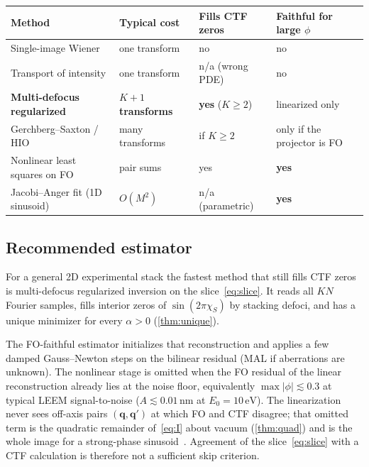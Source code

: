 \documentclass[11pt,a4paper]{article}
\theoremstyle{definition}
\theoremstyle{remark}
\newcommand{\abs}[1]{\lvert#1\rvert}
\begin{document}
\begin{center}
\small
\setlength{\tabcolsep}{4pt}
\begin{tabular}{@{}lp{2.6cm}p{2.6cm}p{2.8cm}@{}}
\toprule
Method & Typical cost & Fills CTF zeros & Faithful for large $\phi$ \\
\midrule
Single-image Wiener & one transform & no & no \\
Transport of intensity & one transform & n/a (wrong PDE) & no \\
\textbf{Multi-defocus regularized} & \textbf{$K{+}1$ transforms} & \textbf{yes} ($K\ge 2$) & linearized only \\
Gerchberg--Saxton / HIO & many transforms & if $K\ge 2$ & only if the projector is FO \\
Nonlinear least squares on FO & pair sums & yes & \textbf{yes} \\
Jacobi--Anger fit (1D sinusoid) & $O(M^2)$ & n/a (parametric) & \textbf{yes} \\
\bottomrule
\end{tabular}
\end{center}

\subsection{Recommended estimator}
\label{sec:verdict}

For a general 2D experimental stack the fastest method that still
fills CTF zeros is multi-defocus regularized inversion on
the slice~\eqref{eq:slice}.
It reads all $KN$ Fourier samples, fills interior zeros of
$\sin(2\pi\chi_S)$ by stacking defoci, and has a unique minimizer for
every $\alpha>0$ (\cref{thm:unique}).

The FO-faithful estimator initializes that reconstruction and applies
a few damped Gauss--Newton steps on the bilinear residual (MAL if
aberrations are unknown).
The nonlinear stage is omitted when the FO residual of the linear
reconstruction already lies at the noise floor, equivalently
$\max\abs{\phi}\lesssim 0.3$ at typical LEEM signal-to-noise
($A\lesssim 0.01\,\mathrm{nm}$ at $E_0=10\,\mathrm{eV}$).
The linearization never sees off-axis pairs
$(\mathbf{q},\mathbf{q}')$ at which FO and CTF disagree; that omitted
term is the quadratic remainder of~\eqref{eq:I} about vacuum
(\cref{thm:quad}) and is the whole image for a strong-phase
sinusoid~\cite{Yu2017}.
Agreement of the slice~\eqref{eq:slice} with a CTF calculation is
therefore not a sufficient skip criterion.
\end{document}
